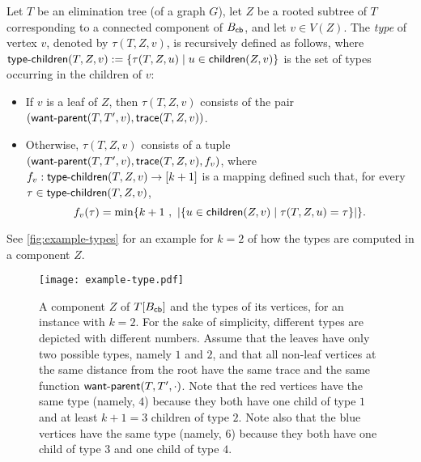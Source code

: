 \documentclass[a4paper,UKenglish,cleveref, autoref, thm-restate]{lipics-v2021}
\newcommand{\child}{{\sf children}\xspace}
\newcommand{\Bcb}{B_{\sf cb}\xspace}
\newcommand{\trace}{{\sf trace}\xspace}
\newcommand{\typechild}{{\sf type\text{-}children}\xspace}
\newcommand{\wantparent}{{\sf {\sf want{\text -}parent}}\xspace}
\begin{document}
\begin{definition}
\label{def:type}
Let $T$ be an elimination tree (of a graph $G$), let $Z$ be a rooted subtree of $T$ corresponding to a connected component of $\Bcb$, and let $v \in V(Z)$. The \emph{type} of  vertex $v$, denoted by $\tau(T,Z,v)$, is recursively defined as follows, where $\typechild(T,Z,v):=\{\tau(T,Z,u) \mid u \in \child(Z,v)\}$ is the set of types occurring in the children of $v$:
\begin{itemize}
    \item If $v$ is a leaf of $Z$, then $\tau(T,Z,v)$ consists of the pair $(\wantparent(T,T',v),\trace(T,Z,v))$.
    \item Otherwise, $\tau(T,Z,v)$ consists of a tuple $(\wantparent(T,T',v),\trace(T,Z,v), f_v)$, where $f_v: \typechild(T,Z,v) \to [k+1]$ is a mapping defined such that, for every $\tau \in \typechild(T,Z,v)$,
    \begin{equation}\label{eq:definition-type}
      f_v(\tau)= \min\{k+1 \ ,\ |\{u \in \child(Z,v) \mid \tau(T,Z,u) = \tau\}|\}.
    \end{equation}
\end{itemize}
\end{definition}

See \autoref{fig:example-types} for an example for $k=2$ of how the types are computed in a component $Z$.


\begin{figure}[h!tb]
    \centering
\texttt{[image: example-type.pdf]}
    \caption{A component $Z$ of $T[\Bcb]$ and the types of its vertices, for an instance with $k=2$. For the sake of simplicity, different types are depicted with different numbers. Assume that the leaves have only two possible types, namely $1$ and $2$, and that all non-leaf vertices at the same distance from the root have the same trace and the same function $\wantparent(T,T',\cdot)$. Note that the red vertices have the same type (namely, $4$) because they both have one child of type $1$ and at least $k+1=3$ children of type $2$. Note also that the blue vertices have the same type (namely, $6$) because they both have one child of type $3$ and one child of type $4$.\label{fig:example-types}}
\end{figure}
\end{document}
